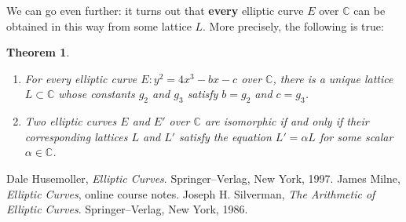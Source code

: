 \documentclass{article}
\newcommand{\C}{\mathbb{C}}
\newtheorem{theorem}{Theorem}
\theoremstyle{definition}
\begin{document}
We can go even further: it turns out that {\bf every} elliptic curve $E$ over $\C$ can be obtained in this way from some lattice $L$. More precisely, the following is true:

\begin{theorem}
\begin{enumerate}
\item For every elliptic curve $E: y^2 = 4x^3 - b x - c$ over $\C$, there is a unique lattice $L \subset \C$ whose constants $g_2$ and $g_3$ satisfy $b = g_2$ and $c = g_3$.
\item Two elliptic curves $E$ and $E'$ over $\C$ are isomorphic if and only if their corresponding lattices $L$ and $L'$ satisfy the equation $L' = \alpha L$ for some scalar $\alpha \in \C$.
\end{enumerate}
\end{theorem}

\begin{thebibliography}{9}
 Dale Husemoller, {\em Elliptic Curves}. Springer--Verlag, New York, 1997.
 James Milne, {\em Elliptic Curves}, online course notes. 
 Joseph H. Silverman, {\em The Arithmetic of Elliptic Curves}. Springer--Verlag, New York, 1986.
\end{thebibliography}
\end{document}
